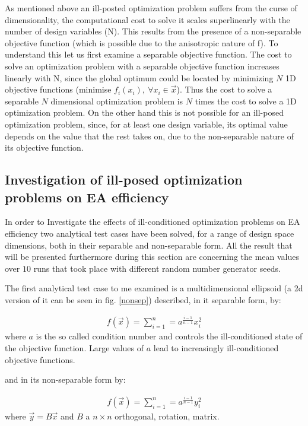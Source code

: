 As mentioned above an ill-posted optimization problem suffers from the curse of dimensionality, the computational cost to solve it scales superlinearly with the number of design variables (N). This results from the presence of a non-separable objective function (which is possible due to the anisotropic nature of f). To understand this let us first examine a separable objective function. The cost to solve an optimization problem with a separable objective function increases linearly with N, since the global optimum could be  located by minimizing $N$ 1D objective functions (minimise $f_i(x_i),~ \forall x_i \in \vec{x}$). Thus the cost to solve a separable $N$ dimensional optimization problem is $N$ times the cost to solve a 1D optimization problem. On the other hand this is not possible for an ill-posed optimization problem, since, for at least one design variable, its optimal value depends on the value that the rest takes on, due to the non-separable nature of its objective function.     
 
\subsection{Investigation of ill-posed optimization problems on EA efficiency}
\label{Inv2}

In order to Investigate the effects of ill-conditioned optimization problems on EA efficiency two analytical test cases have been solved, for a range of design space dimensions, both in their separable and non-separable form. All the result that will be presented furthermore during this section are concerning the mean values over $10$ runs that took place with different random number generator seeds. 

The first analytical test case to me examined is a multidimensional ellipsoid (a 2d version of it can be seen in fig. \ref{nonsep}) described, in it separable form, by:   


\begin{eqnarray}
   f(\vec{x})=\sum^{n}_{i=1}=a^{\frac{i-1}{n-1}}x_i^2
   \label{ellipse} 
\end{eqnarray}
where $a$ is the so called condition number and controls the ill-conditioned state of the objective function. Large values of $a$ lead to increasingly ill-conditioned objective functions.

and in its non-separable form by:

\begin{eqnarray}
   f(\vec{x})=\sum^{n}_{i=1}=a^{\frac{i-1}{n-1}}y_i^2
   \label{ellipse} 
\end{eqnarray}
where $\vec{y}=B\vec{x}$ and $B$ a $n\times n$ orthogonal, rotation, matrix.

